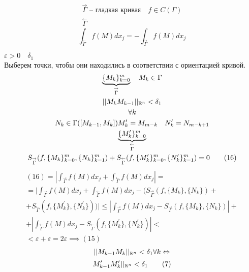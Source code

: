 \documentclass[main]{subfiles}
\begin{document}
\begin{theorem}
    \begin{gather*}
        \stackrel{\rightarrow}{\Gamma} \text{ -- гладкая кривая} \quad f \in C(\Gamma) \\
        \stackrel{\leftarrow}{\Gamma} 
    \end{gather*}
    \[ \int_{\stackrel{\leftarrow}{\Gamma}} f(M)dx_j = - \int_{\stackrel{\rightarrow}{\Gamma}} f(M)dx_j \tag{15} \] 
\end{theorem}
\begin{longProof}
    $\varepsilon > 0 \quad \delta_1$\\
    Выберем точки, чтобы они находились в соответствии с ориентацией кривой.
    \begin{gather*}
        \underbrace{\{ M_k \}^m_{k=0}}_{\stackrel{\rightarrow}{\Gamma}} \quad M_k \in \Gamma \\
        ||M_kM_{k-1}||_{{\mathbb{R}^n}} < \delta_1 \\
        \forall k \\
        N_k \in \Gamma([M_{k-1},M_k])
        M^\prime_k = M_{m-k} \quad N^\prime_k = N_{m-k+1}\\
        \underbrace{\{ M^\prime_k \}^m_{k=0}}_{\stackrel{\leftarrow}{\Gamma}}\\
        S_{\stackrel{\rightarrow}{\Gamma}}(f, \{M_k\}^m_{k=0}, \{N_k\}^m_{k=1}) + 
        S_{\stackrel{\leftarrow}{\Gamma}}(f, \{M^\prime_k\}^m_{k=0}, \{N^\prime_k\}^m_{k=1}) = 0 \tag{16}
    \end{gather*}
    \begin{multline*}
        (16) = \left| \int_{\stackrel{\rightarrow}{\Gamma}}f(M)dx_j + \int_{\stackrel{\leftarrow}{\Gamma}} f(M)dx_j \right| = \\
        =  \bigg| \int_{\stackrel{\rightarrow}{\Gamma}} f(M)dx_j + \int_{\stackrel{\leftarrow}{\Gamma}} f(M)dx_j  -
        (S_{\stackrel{\rightarrow}{\Gamma}}(f, \{M_k\}, \{N_k\}) + \\ 
        + S_{\stackrel{\leftarrow}{\Gamma}}(f, \{M^\prime_k\}, \{N^\prime_k\})) \bigg| 
        \leq \left| \int_{\stackrel{\rightarrow}{\Gamma}}f(M)dx_j - S_{\stackrel{\rightarrow}{\Gamma}}(f, \{M_k\},\{N_k\}) \right| + \\
        + \left| \int_{\stackrel{\leftarrow}{\Gamma}} f(M)dx_j-S_{\stackrel{\leftarrow}{\Gamma}}(f, \{ M^\prime_k\},\{ N^\prime_k\} ) \right| < \\
        < \varepsilon + \varepsilon = 2\varepsilon \implies(15)
    \end{multline*}
        \[|| M_{k-1}M_k||_{{\mathbb{R}^n}} < \delta_1 \forall k \Leftrightarrow \]
        \[M^\prime_{k-1}M^\prime_{k}||_{{\mathbb{R}^n}} < \delta_1 \tag{7}\]
\end{longProof}
\end{document}
